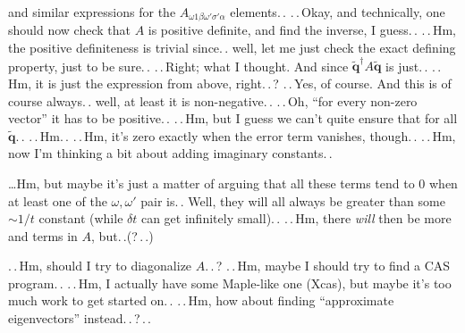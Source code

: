 \documentclass{report}
\begin{document}
and similar expressions for the $A_{\omega 1\beta\omega'\sigma'\alpha}$ elements.\,. 
.\,.\,Okay, and technically, one should now check that $A$ is positive definite, and find the inverse, I guess.\,. %
.\,.\,Hm, the positive definiteness is trivial since.\,. well, let me just check the exact defining property, just to be sure.\,. .\,.\,Right; what I thought. And since $\tilde{\boldsymbol{q}}^\dagger A \tilde{\boldsymbol{q}}$ is just.\,. .\,.\,Hm, it is just the expression from above, right.\,.\,? .\,.\,Yes, of course. And this is of course always.\,. well, at least it is non-negative.\,. .\,.\,Oh, ``for every non-zero vector'' it has to be positive.\,. .\,.\,Hm, but I guess we can't quite ensure that for all $\tilde{\boldsymbol{q}}$.\,. .\,.\,Hm.\,. .\,.\,Hm, it's zero exactly when the error term vanishes, though.\,. %
.\,.\,Hm, now I'm thinking a bit about adding imaginary constants.\,.  

\ldots Hm, but maybe it's just a matter of arguing that all these terms tend to 0 when at least one of the $\omega,\omega'$ pair is.\,. Well, they will all always be greater than some $\sim 1/ t$ constant (while $\delta t$ can get infinitely small).\,. .\,.\,Hm, there \emph{will} then be more and terms in $A$, but.\,.(?\,.\,.) 

.\,.\,Hm, should I try to diagonalize $A$.\,.\,? .\,.\,Hm, maybe I should try to find a CAS program.\,. .\,.\,Hm, I actually have some Maple-like one (Xcas), but maybe it's too much work to get started on.\,. .\,.\,Hm, how about finding ``approximate eigenvectors'' instead.\,.\,?\,.\,. 
\end{document}
